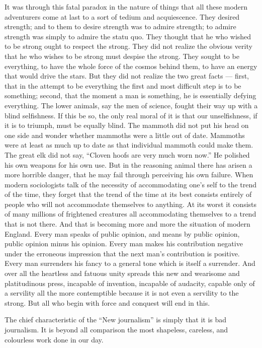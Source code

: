 It was through this fatal paradox in the nature of things that all these modern adventurers come at last to a sort of tedium and acquiescence. They desired strength; and to them to desire strength was to admire strength; to admire strength was simply to admire the statu quo. They thought that he who wished to be strong ought to respect the strong. They did not realize the obvious verity that he who wishes to be strong must despise the strong. They sought to be everything, to have the whole force of the cosmos behind them, to have an energy that would drive the stars. But they did not realize the two great facts — first, that in the attempt to be everything the first and most difficult step is to be something; second, that the moment a man is something, he is essentially defying everything. The lower animals, say the men of science, fought their way up with a blind selfishness. If this be so, the only real moral of it is that our unselfishness, if it is to triumph, must be equally blind. The mammoth did not put his head on one side and wonder whether mammoths were a little out of date. Mammoths were at least as much up to date as that individual mammoth could make them. The great elk did not say, “Cloven hoofs are very much worn now.” He polished his own weapons for his own use. But in the reasoning animal there has arisen a more horrible danger, that he may fail through perceiving his own failure. When modern sociologists talk of the necessity of accommodating one’s self to the trend of the time, they forget that the trend of the time at its best consists entirely of people who will not accommodate themselves to anything. At its worst it consists of many millions of frightened creatures all accommodating themselves to a trend that is not there. And that is becoming more and more the situation of modern England. Every man speaks of public opinion, and means by public opinion, public opinion minus his opinion. Every man makes his contribution negative under the erroneous impression that the next man’s contribution is positive. Every man surrenders his fancy to a general tone which is itself a surrender. And over all the heartless and fatuous unity spreads this new and wearisome and platitudinous press, incapable of invention, incapable of audacity, capable only of a servility all the more contemptible because it is not even a servility to the strong. But all who begin with force and conquest will end in this.

The chief characteristic of the “New journalism” is simply that it is bad journalism. It is beyond all comparison the most shapeless, careless, and colourless work done in our day.

